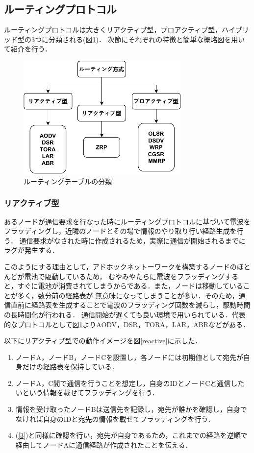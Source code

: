 \documentclass[a4paper, 11pt]{ltjsarticle}
\begin{document}
\subsection{ルーティングプロトコル}
ルーティングプロトコルは大きくリアクティブ型，プロアクティブ型，ハイブリッド型の3つに分類される(図\ref{routing_classification})．
次節にそれぞれの特徴と簡単な概略図を用いて紹介を行う．
\begin{figure}[H]
  \centering
  \includegraphics[width=85mm]{classification_of_routing.pdf}
  \caption{ルーティングテーブルの分類}
  \label{routing_classification}
\end{figure}

\subsubsection{リアクティブ型}
あるノードが通信要求を行なった時にルーティングプロトコルに基づいて電波をフラッディングし，近隣のノードとその場で情報のやり取り行い経路生成を行う．
通信要求がなされた時に作成されるため，実際に通信が開始されるまでにラグが発生する．

このようにする理由として，アドホックネットーワークを構築するノードのほとんどが電池で駆動しているため，
むやみやたらに電波をフラッディングすると，すぐに電池が消費されてしまうからである．また，ノードは移動していることが多く，数分前の経路表が
無意味になってしまうことが多い．そのため，通信直前に経路表を生成することで電波のフラッディング回数を減らし，駆動時間の長時間化が行われる．
通信開始が遅くても良い環境で用いられている．代表的なプロトコルとして図\ref{routing_classification}よりAODV，DSR，TORA，LAR，ABRなどがある．

以下にリアクティブ型での動作イメージを図\ref{reactive}に示した．
\begin{enumerate}
  \renewcommand{\labelenumi}{(\arabic{enumi})}
  \item \label{1} ノードA，ノードB，ノードCを設置し，各ノードには初期値として宛先が自身だけの経路表を保持している．
  \item \label{2} ノードA，C間で通信を行うことを想定し，自身のIDとノードCと通信したいという情報を載せてフラッディングを行う．
  \item \label{3} 情報を受け取ったノードBは送信先を記録し，宛先が誰かを確認し，自身でなければ自身のIDと宛先の情報を載せてフラッディングを行う．
  \item \label{4} (\ref{3})と同様に確認を行い，宛先が自身であるため，これまでの経路を逆順で経由してノードAに通信経路が作成されたことを伝える．
\end{enumerate}
\end{document}
